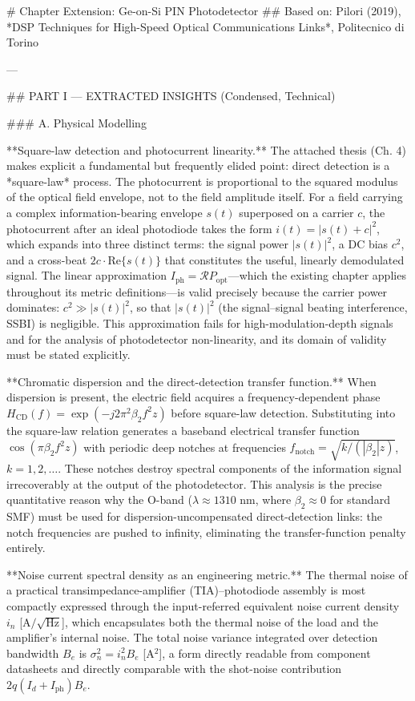 # Chapter Extension: Ge-on-Si PIN Photodetector
## Based on: Pilori (2019), *DSP Techniques for High-Speed Optical Communications Links*, Politecnico di Torino

---

## PART I — EXTRACTED INSIGHTS (Condensed, Technical)

### A. Physical Modelling

**Square-law detection and photocurrent linearity.** The attached thesis (Ch. 4) makes explicit a fundamental but frequently elided point: direct detection is a *square-law* process. The photocurrent is proportional to the squared modulus of the optical field envelope, not to the field amplitude itself. For a field carrying a complex information-bearing envelope $s(t)$ superposed on a carrier $c$, the photocurrent after an ideal photodiode takes the form $i(t) = |s(t) + c|^2$, which expands into three distinct terms: the signal power $|s(t)|^2$, a DC bias $c^2$, and a cross-beat $2c \cdot \mathrm{Re}\{s(t)\}$ that constitutes the useful, linearly demodulated signal. The linear approximation $I_\mathrm{ph} = \mathcal{R} P_\mathrm{opt}$—which the existing chapter applies throughout its metric definitions—is valid precisely because the carrier power dominates: $c^2 \gg |s(t)|^2$, so that $|s(t)|^2$ (the signal–signal beating interference, SSBI) is negligible. This approximation fails for high-modulation-depth signals and for the analysis of photodetector non-linearity, and its domain of validity must be stated explicitly.

**Chromatic dispersion and the direct-detection transfer function.** When dispersion is present, the electric field acquires a frequency-dependent phase $H_\mathrm{CD}(f) = \exp(-j2\pi^2\beta_2 f^2 z)$ before square-law detection. Substituting into the square-law relation generates a baseband electrical transfer function $\cos(\pi\beta_2 f^2 z)$ with periodic deep notches at frequencies $f_\mathrm{notch} = \sqrt{k/(|\beta_2|z)}$, $k = 1, 2, \ldots$. These notches destroy spectral components of the information signal irrecoverably at the output of the photodetector. This analysis is the precise quantitative reason why the O-band ($\lambda \approx 1310$ nm, where $\beta_2 \approx 0$ for standard SMF) must be used for dispersion-uncompensated direct-detection links: the notch frequencies are pushed to infinity, eliminating the transfer-function penalty entirely.

**Noise current spectral density as an engineering metric.** The thermal noise of a practical transimpedance-amplifier (TIA)–photodiode assembly is most compactly expressed through the input-referred equivalent noise current density $i_n$ [A$/\sqrt{\mathrm{Hz}}$], which encapsulates both the thermal noise of the load and the amplifier's internal noise. The total noise variance integrated over detection bandwidth $B_e$ is $\sigma_n^2 = i_n^2 B_e$ [A$^2$], a form directly readable from component datasheets and directly comparable with the shot-noise contribution $2q(I_d + I_\mathrm{ph}) B_e$.

